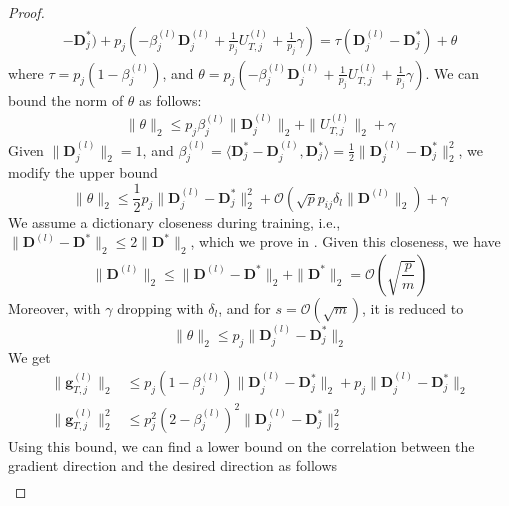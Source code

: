 \documentclass[10pt]{article} %
\newcommand{\D}{{\bm D}}
\newcommand{\g}{{\bm g}}
\begin{document}
\begin{proof}
\begin{equation}
\begin{aligned}
    - \D_j^{\ast}) + p_j (- \beta_j^{(l)} \D_j^{(l)} + \frac{1}{p_j} U_{T, j}^{(l)} + \frac{1}{p_j}\gamma) = \tau (\D_j^{(l)}
    - \D_j^{\ast}) + \theta
\end{aligned}
\end{equation}
where $\tau = p_j (1 - \beta_j^{(l)})$, and $\theta = p_j (- \beta_j^{(l)} \D_j^{(l)} + \frac{1}{p_j} U_{T, j}^{(l)} + \frac{1}{p_j}\gamma)$. We can bound the norm of $\theta$ as follows:
\begin{equation}
\begin{aligned}
  \| \theta \|_2 \leq p_j \beta_j^{(l)} \| \D_j^{(l)}\|_2  + \| U_{T, j}^{(l)} \|_2 + \gamma
\end{aligned}
\end{equation}
Given $\| \D_j^{(l)} \|_2 = 1$, and $\beta_j^{(l)} =  \langle \D_j^{\ast} - \D_j^{(l)}, \D_j^{\ast} \rangle = \frac{1}{2} \| \D_j^{(l)} - \D_j^{\ast} \|_2^2$, we modify the upper bound
\begin{equation}
  \| \theta \|_2 \leq \frac{1}{2} p_j \| \D_j^{(l)} - \D_j^{\ast} \|_2^2  + \mathcal{O}(\sqrt{p} p_{ij} \delta_l \| \D^{(l)}\|_2) + \gamma
\end{equation}
We assume a dictionary closeness during training, i.e., $\| \D^{(l)} - \D^{\ast} \|_2 \leq 2 \| \D^{\ast} \|_2$, which we prove in . Given this closeness, we have
\begin{equation}
  \| \D^{(l)} \|_2 \leq \| \D^{(l)} - \D^{\ast} \|_2 + \| \D^{\ast} \|_2 = \mathcal{O}(\sqrt{\frac{p}{m}})
\end{equation}
Moreover, with $\gamma$ dropping with $\delta_l$, and for $s =\mathcal{O}(\sqrt{m})$, it is reduced to
\begin{equation}
  \| \theta \|_2 \leq p_j \| \D_j^{(l)} - \D_j^{\ast} \|_2
\end{equation}
We get
\begin{equation}
\begin{aligned}
  \| \g_{T, j}^{(l)} \|_2 &\leq p_j (1 - \beta_j^{(l)}) \| \D_j^{(l)}
    - \D_j^{\ast} \|_2 + p_j \| \D_j^{(l)}
    - \D_j^{\ast} \|_2\\
  \| \g_{T, j}^{(l)} \|_2^2 &\leq p_j^2 (2 - \beta_j^{(l)})^2 \| \D_j^{(l)}
    - \D_j^{\ast} \|_2^2
\end{aligned}
\end{equation}
Using this bound, we can find a lower bound on the correlation between the gradient direction and the desired direction as follows
\begin{equation}
\begin{aligned}

\end{aligned}
\end{equation}
\end{proof}
\end{document}
